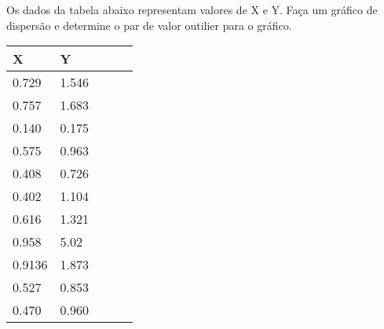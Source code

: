 \begin{exercise}
	
	Os dados da tabela abaixo representam valores de X e Y. Faça um gráfico de dispersão e determine o par de valor outilier para o gráfico.
	
	\begin{tabular}{lllll}
		\hline
		X & Y &  &  &  \\ \hline
		0.729      & 1.546&  &  &  \\
		0.757      & 1.683&  &  &  \\
		0.140      & 0.175 &  &  &  \\
		0.575      & 0.963 &  &  &  \\
		0.408      & 0.726 &  &  &  \\
		0.402      & 1.104 &  &  &  \\
		0.616      & 1.321 &  &  &  \\
		0.958      & 5.02 &  &  &  \\
		0.9136      & 1.873 &  &  &  \\
		0.527      & 0.853 &  &  &  \\
		0.470      & 0.960 &  &  &  \\ \hline
	\end{tabular}
\end{exercise}